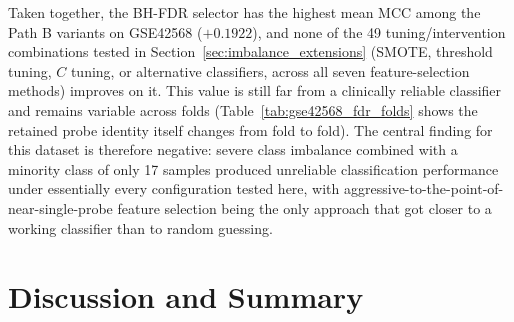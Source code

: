 Taken together, the BH-FDR selector has the highest mean MCC among the Path B variants on GSE42568 ($+0.1922$), and none of the 49 tuning/intervention combinations tested in Section~\ref{sec:imbalance_extensions} (SMOTE, threshold tuning, $C$ tuning, or alternative classifiers, across all seven feature-selection methods) improves on it. This value is still far from a clinically reliable classifier and remains variable across folds (Table~\ref{tab:gse42568_fdr_folds} shows the retained probe identity itself changes from fold to fold). The central finding for this dataset is therefore negative: severe class imbalance combined with a minority class of only 17 samples produced unreliable classification performance under essentially every configuration tested here, with aggressive-to-the-point-of-near-single-probe feature selection being the only approach that got closer to a working classifier than to random guessing.

\section{Discussion and Summary}

